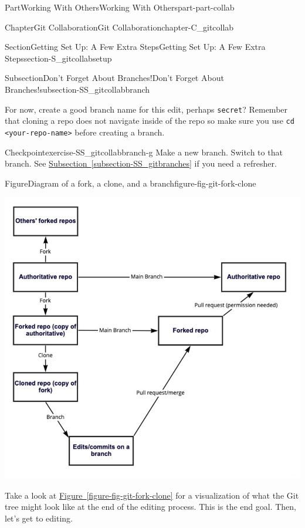 \documentclass[oneside,10pt,]{book}
\newcommand{\xreffont}{\relax}
\newcommand{\mono}[1]{\texttt{#1}}
\begin{document}
\begin{partptx}{Part}{Working With Others}{}{Working With Others}{}{}{part-part-collab}
\begin{chapterptx}{Chapter}{Git Collaboration}{}{Git Collaboration}{}{}{chapter-C_gitcollab}
\begin{sectionptx}{Section}{Getting Set Up: A Few Extra Steps}{}{Getting Set Up: A Few Extra Steps}{}{}{section-S_gitcollabsetup}
\begin{subsectionptx}{Subsection}{Don't Forget About Branches!}{}{Don't Forget About Branches!}{}{}{subsection-SS_gitcollabbranch}
\par
For now, create a good branch name for this edit, perhaps \mono{secret}? Remember that cloning a repo does not navigate inside of the repo so make sure you use \mono{cd <your-repo-name>} before creating a branch.%
\begin{inlineexercise}{Checkpoint}{}{exercise-SS_gitcollabbranch-g}%
Make a new branch. Switch to that branch. See \hyperref[subsection-SS_gitbranches]{Subsection~{\xreffont\ref{subsection-SS_gitbranches}}} if you need a refresher.%
\end{inlineexercise}%
\begin{figureptx}{Figure}{Diagram of a fork, a clone, and a branch}{figure-fig-git-fork-clone}{}%
\begin{image}{0.1}{0.8}{0.1}{}%
\includegraphics[width=\linewidth]{external/git_fork_clone.pdf}
\end{image}%
\tcblower
\end{figureptx}%
Take a look at \hyperref[figure-fig-git-fork-clone]{Figure~{\xreffont\ref{figure-fig-git-fork-clone}}} for a visualization of what the Git tree might look like at the end of the editing process. This is the end goal. Then, let's get to editing.%
\end{subsectionptx}
\end{sectionptx}
%
%
\typeout{************************************************}

\end{chapterptx}
\end{partptx}
\end{document}
